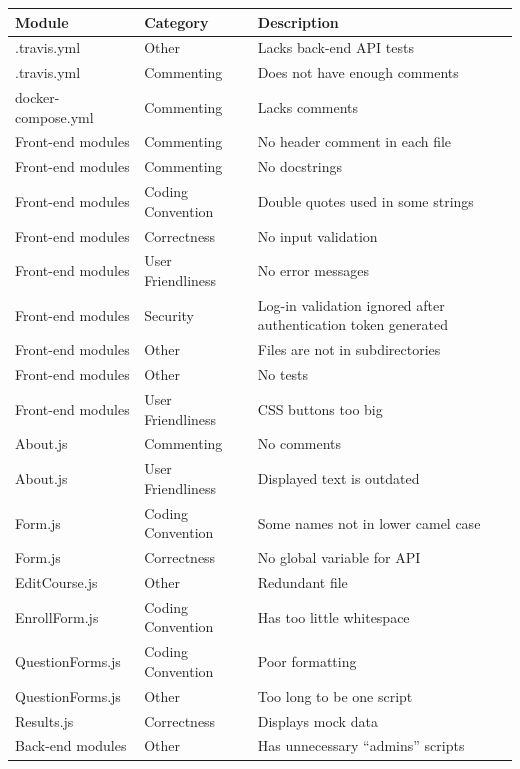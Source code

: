 \documentclass{article}
\begin{document}
\begin{center}
\begin{tabular}{|p{4cm}|p{3cm}|p{6cm}|} 
\hline
\textbf{Module} & \textbf{Category} & \textbf{Description} \\
\hline
.travis.yml & Other & Lacks back-end API tests \\ 
\hline
.travis.yml & Commenting & Does not have enough comments\\ 
\hline
docker-compose.yml & Commenting & Lacks comments\\ 
\hline
Front-end modules & Commenting & No header comment in each file\\ 
\hline
Front-end modules & Commenting & No docstrings \\ 
\hline
Front-end modules & Coding Convention & Double quotes used in some strings\\ 
\hline
Front-end modules & Correctness & No input validation\\ 
\hline
Front-end modules & User Friendliness & No error messages\\ 
\hline
Front-end modules & Security & Log-in validation ignored after authentication token generated\\ 
\hline
Front-end modules & Other & Files are not in subdirectories\\ 
\hline
Front-end modules & Other & No tests\\ 
\hline
Front-end modules & User Friendliness & CSS buttons too big \\ 
\hline
About.js & Commenting & No comments\\ 
\hline
About.js & User Friendliness & Displayed text is outdated\\ 
\hline
Form.js & Coding Convention & Some names not in lower camel case\\ 
\hline
Form.js & Correctness & No global variable for API\\ 
\hline
EditCourse.js & Other & Redundant file\\ 
\hline
EnrollForm.js & Coding Convention & Has too little whitespace\\ 
\hline
QuestionForms.js & Coding Convention & Poor formatting\\ 
\hline
QuestionForms.js & Other & Too long to be one script\\ 
\hline
Results.js & Correctness & Displays mock data\\ 
\hline
Back-end modules & Other & Has unnecessary ``admins'' scripts\\ 

\end{tabular}
\end{center}
\end{document}
